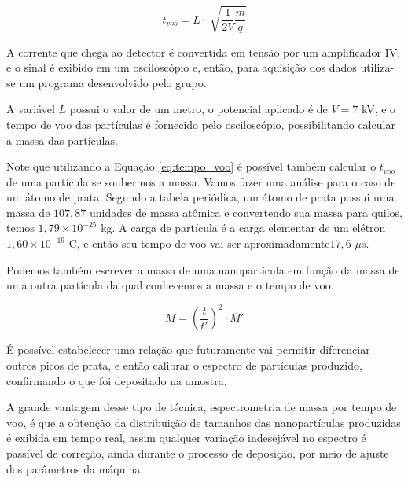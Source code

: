 \begin{equation}
\label{eq:tempo_voo}
t_{voo} = L \cdot \sqrt[]{\frac{1}{2V} \frac{m}{q}} 
\end{equation}


A corrente que chega ao detector é convertida em tensão por um amplificador IV, e o sinal é exibido em um osciloscópio e, então, para aquisição dos dados utiliza-se um programa desenvolvido pelo grupo.

A variável $L$ possui o valor de um metro, o potencial aplicado é de $V = 7 $  kV, e o tempo de voo das partículas é fornecido pelo osciloscópio, possibilitando calcular a massa das partículas.

Note que utilizando a Equação \ref{eq:tempo_voo} é possível também calcular o $t_{voo}$ de uma partícula se soubermos a massa. Vamos fazer uma análise para o caso de um átomo de prata. Segundo a tabela periódica, um átomo de prata possui uma massa de $107,87$ unidades de massa atômica e convertendo sua massa para quilos, temos $1,79\times 10^{-25}$ kg. A carga de partícula é a carga elementar de um elétron $1,60\times 10^{-19}$ C, e então seu tempo de voo vai ser aproximadamente$17,6$ $\mu$s.

Podemos também escrever a massa de uma nanopartícula em função da massa de uma outra partícula da qual conhecemos a massa e o tempo de voo.

\begin{equation}
\label{eq:relacao_massa_tempo}
M = \left(\frac{t}{t'}\right)^2 \cdot M'
\end{equation}


É possível estabelecer uma relação que futuramente vai permitir diferenciar outros picos de prata, e então calibrar o espectro de partículas produzido, confirmando o que foi depositado na amostra.


A grande vantagem desse tipo de técnica, espectrometria de massa por tempo de voo, é que a obtenção da distribuição de tamanhos das nanopartículas produzidas é exibida em tempo real, assim qualquer variação indesejável no espectro é passível de correção, ainda durante o processo de deposição, por meio de ajuste  dos parâmetros da máquina. 
